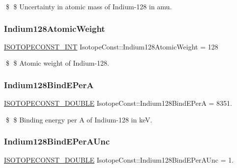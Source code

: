 \$ \$ Uncertainty in atomic mass of Indium-\/128 in amu. \mbox{\label{group___isotope_const-_indium-_in128_ga597df5fc0c1bac9833d9a822af231994}} 
\subsubsection{\texorpdfstring{Indium128\+Atomic\+Weight}{Indium128AtomicWeight}}
{\footnotesize\ttfamily \mbox{\hyperlink{group___isotope_const-_macros_ga5f18360b3e99483a35c32d789e62621c}{I\+S\+O\+T\+O\+P\+E\+C\+O\+N\+S\+T\+\_\+\+I\+NT}} Isotope\+Const\+::\+Indium128\+Atomic\+Weight = 128}

\$ \$ Atomic weight of Indium-\/128. \mbox{\label{group___isotope_const-_indium-_in128_ga86788e5e16f9a08d29a2854cb1b7d177}} 
\subsubsection{\texorpdfstring{Indium128\+Bind\+E\+PerA}{Indium128BindEPerA}}
{\footnotesize\ttfamily \mbox{\hyperlink{group___isotope_const-_macros_ga8f45a7272ce02c0b4c65c44636ed719a}{I\+S\+O\+T\+O\+P\+E\+C\+O\+N\+S\+T\+\_\+\+D\+O\+U\+B\+LE}} Isotope\+Const\+::\+Indium128\+Bind\+E\+PerA = 8351.}

\$ \$ Binding energy per A of Indium-\/128 in keV. \mbox{\label{group___isotope_const-_indium-_in128_gac5a9e32dff4202157f9d202041860099}} 
\subsubsection{\texorpdfstring{Indium128\+Bind\+E\+Per\+A\+Unc}{Indium128BindEPerAUnc}}
{\footnotesize\ttfamily \mbox{\hyperlink{group___isotope_const-_macros_ga8f45a7272ce02c0b4c65c44636ed719a}{I\+S\+O\+T\+O\+P\+E\+C\+O\+N\+S\+T\+\_\+\+D\+O\+U\+B\+LE}} Isotope\+Const\+::\+Indium128\+Bind\+E\+Per\+A\+Unc = 1.}

